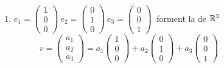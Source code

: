 \begin{frame}
\begin{exemple}
\begin{enumerate}
  \pause
  \item 
$e_1 = \left(\begin{smallmatrix}1\\0\\0\end{smallmatrix}\right)~
  e_2 = \left(\begin{smallmatrix}0\\1\\0\end{smallmatrix}\right)~
  e_3 = \left(\begin{smallmatrix}0\\0\\1\end{smallmatrix}\right)~$
   forment la  de $\mathbb{R}^3$  
   \pause
$\qquad\quad v = \left(\begin{smallmatrix}a_1\\ a_2\\ a_3\end{smallmatrix}\right)
= a_1 \left(\begin{smallmatrix}1\\0\\0\end{smallmatrix}\right) 
+ a_2 \left(\begin{smallmatrix}0\\1\\0\end{smallmatrix}\right)
+ a_3 \left(\begin{smallmatrix}0\\0\\1\end{smallmatrix}\right)$
\end{enumerate}
\end{exemple}

\end{frame}





